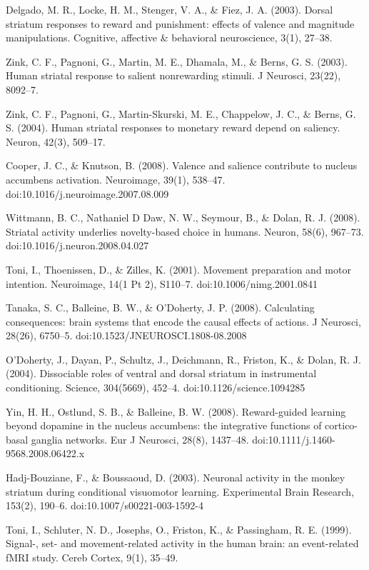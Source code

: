 Delgado, M. R., Locke, H. M., Stenger, V. A., & Fiez, J. A. (2003). Dorsal striatum responses to reward and punishment: effects of valence and magnitude manipulations. Cognitive, affective & behavioral neuroscience, 3(1), 27–38.

Zink, C. F., Pagnoni, G., Martin, M. E., Dhamala, M., & Berns, G. S. (2003). Human striatal response to salient nonrewarding stimuli. J Neurosci, 23(22), 8092–7.

Zink, C. F., Pagnoni, G., Martin-Skurski, M. E., Chappelow, J. C., & Berns, G. S. (2004). Human striatal responses to monetary reward depend on saliency. Neuron, 42(3), 509–17.

Cooper, J. C., & Knutson, B. (2008). Valence and salience contribute to nucleus accumbens activation. Neuroimage, 39(1), 538–47. doi:10.1016/j.neuroimage.2007.08.009

Wittmann, B. C., Nathaniel D Daw, N. W., Seymour, B., & Dolan, R. J. (2008). Striatal activity underlies novelty-based choice in humans. Neuron, 58(6), 967–73. doi:10.1016/j.neuron.2008.04.027

Toni, I., Thoenissen, D., & Zilles, K. (2001). Movement preparation and motor intention. Neuroimage, 14(1 Pt 2), S110–7. doi:10.1006/nimg.2001.0841

Tanaka, S. C., Balleine, B. W., & O'Doherty, J. P. (2008). Calculating consequences: brain systems that encode the causal effects of actions. J Neurosci, 28(26), 6750–5. doi:10.1523/JNEUROSCI.1808-08.2008

O'Doherty, J., Dayan, P., Schultz, J., Deichmann, R., Friston, K., & Dolan, R. J. (2004). Dissociable roles of ventral and dorsal striatum in instrumental conditioning. Science, 304(5669), 452–4. doi:10.1126/science.1094285

Yin, H. H., Ostlund, S. B., & Balleine, B. W. (2008). Reward-guided learning beyond dopamine in the nucleus accumbens: the integrative functions of cortico-basal ganglia networks. Eur J Neurosci, 28(8), 1437–48. doi:10.1111/j.1460-9568.2008.06422.x

Hadj-Bouziane, F., & Boussaoud, D. (2003). Neuronal activity in the monkey striatum during conditional visuomotor learning. Experimental Brain Research, 153(2), 190–6. doi:10.1007/s00221-003-1592-4

Toni, I., Schluter, N. D., Josephs, O., Friston, K., & Passingham, R. E. (1999). Signal-, set- and movement-related activity in the human brain: an event-related fMRI study. Cereb Cortex, 9(1), 35–49.

